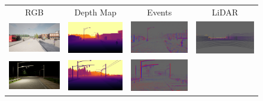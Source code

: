 \begin{figure}
  \centering
  \setlength\tabcolsep{1pt}
  \begin{tabular}{@{}cccc@{}}
    RGB & Depth Map & Events & LiDAR \\
    \includegraphics[width=0.245\linewidth]{mainmatter/figures/4_depth_conv/sled_content/Town01_04_rgb.png} &
    \includegraphics[width=0.245\linewidth]{mainmatter/figures/4_depth_conv/sled_content/Town01_04_depth.png} &
    \includegraphics[width=0.245\linewidth]{mainmatter/figures/4_depth_conv/sled_content/Town01_04_events_lightgray_fixed.png} &
    \includegraphics[width=0.245\linewidth]{mainmatter/figures/4_depth_conv/sled_content/Town01_04_lidar_lightgray_fixed.png} \\
    \includegraphics[width=0.245\linewidth]{mainmatter/figures/4_depth_conv/sled_content/Town07_00_rgb.png} &
    \includegraphics[width=0.245\linewidth]{mainmatter/figures/4_depth_conv/sled_content/Town07_00_depth.png} &
    \includegraphics[width=0.245\linewidth]{mainmatter/figures/4_depth_conv/sled_content/Town07_00_events_lightgray_fixed.png} &

\end{tabular}
\end{figure}
